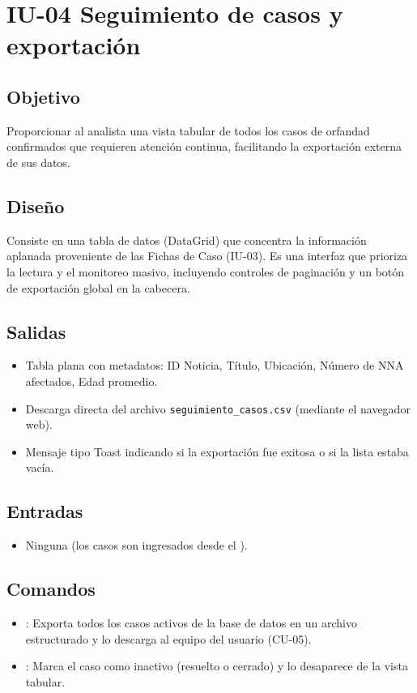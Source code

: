 \section{IU-04 Seguimiento de casos y exportación}

\subsection{Objetivo}
	Proporcionar al analista una vista tabular de todos los casos de orfandad confirmados que requieren atención continua, facilitando la exportación externa de sus datos.

\subsection{Diseño}
	Consiste en una tabla de datos (DataGrid) que concentra la información aplanada proveniente de las Fichas de Caso (IU-03). Es una interfaz que prioriza la lectura y el monitoreo masivo, incluyendo controles de paginación y un botón de exportación global en la cabecera.


\subsection{Salidas}
	\begin{itemize}
		\item Tabla plana con metadatos: ID Noticia, Título, Ubicación, Número de NNA afectados, Edad promedio.
		\item Descarga directa del archivo \texttt{seguimiento\_casos.csv} (mediante el navegador web).
		\item Mensaje tipo Toast indicando si la exportación fue exitosa o si la lista estaba vacía.
	\end{itemize}
	
\subsection{Entradas}
	\begin{itemize}
		\item Ninguna (los casos son ingresados desde el ).
	\end{itemize}

\subsection{Comandos}
	\begin{itemize}
		\item {}: Exporta todos los casos activos de la base de datos en un archivo estructurado y lo descarga al equipo del usuario (CU-05).
		\item {}: Marca el caso como inactivo (resuelto o cerrado) y lo desaparece de la vista tabular.
	\end{itemize}
